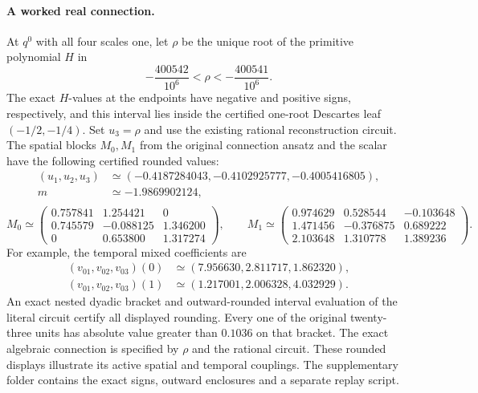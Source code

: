 \documentclass[11pt,a4paper]{article}
\theoremstyle{remark}\newtheorem{remark}[theorem]{Remark}
\begin{document}
\paragraph{A worked real connection.}
At $q^0$ with all four scales one, let $\rho$ be the unique root of the
primitive polynomial $H$ in
\[
 -\frac{400542}{10^6}<\rho<-\frac{400541}{10^6}.
\]
The exact $H$-values at the endpoints have negative and positive signs,
respectively, and this
interval lies inside the certified one-root Descartes leaf
$(-1/2,-1/4)$.  Set $u_3=\rho$ and use the existing rational
reconstruction circuit.  The spatial blocks $M_0,M_1$ from the original connection ansatz and
the scalar have the following certified rounded values:
\[
\begin{aligned}
 (u_1,u_2,u_3)&\simeq (-0.4187284043,-0.4102925777,-0.4005416805),\\
 m&\simeq -1.9869902124,\\[-0.2em]
\end{aligned}
\]
\[
 M_0\simeq\begin{pmatrix}0.757841 & 1.254421 & 0 \\ 0.745579 & -0.088125 & 1.346200 \\ 0 & 0.653800 & 1.317274\end{pmatrix},\qquad
 M_1\simeq\begin{pmatrix}0.974629 & 0.528544 & -0.103648 \\ 1.471456 & -0.376875 & 0.689222 \\ 2.103648 & 1.310778 & 1.389236\end{pmatrix}.
\]
For example, the temporal mixed coefficients are
\[
\begin{aligned}
 (v_{01},v_{02},v_{03})(0)&\simeq (7.956630,2.811717,1.862320),\\
 (v_{01},v_{02},v_{03})(1)&\simeq (1.217001,2.006328,4.032929).
\end{aligned}
\]
An exact nested dyadic bracket and outward-rounded interval evaluation
of the literal circuit certify all displayed rounding.  Every one of
the original twenty-three units has absolute value greater than
$0.1036$ on that bracket.  The exact algebraic connection is specified by $\rho$ and the rational
circuit. These rounded displays illustrate its active spatial and temporal
couplings. The supplementary folder 
contains the exact signs, outward enclosures and a separate replay script.
\end{document}
